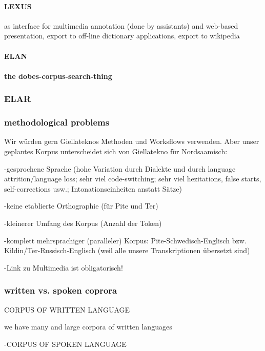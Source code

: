 \documentclass[a4paper,12pt]{article}
\begin{document}
\paragraph{LEXUS} as interface for multimedia annotation (done by assistants) and web-based presentation, export to off-line dictionary applications, export to wikipedia

\paragraph{ELAN}

\paragraph{the dobes-corpus-search-thing}

\subsubsection{ELAR}

\subsubsection{methodological problems}

Wir würden gern Giellateknos Methoden und Worksflows verwenden. Aber unser geplantes Korpus unterscheidet sich von Giellatekno für Nordsaamisch:

-gesprochene Sprache (hohe Variation durch Dialekte und durch language attrition/language loss; sehr viel code-switching; sehr viel hezitations, false starts, self-corrections usw.; Intonationseinheiten anstatt Sätze)

-keine etablierte Orthographie (für Pite und Ter)

-kleinerer Umfang des Korpus (Anzahl der Token)

-komplett mehrsprachiger (paralleler) Korpus: Pite-Schwedisch-Englisch bzw. Kildin/Ter-Russisch-Englisch (weil alle unsere Transkriptionen übersetzt sind)

-Link zu Multimedia ist obligatorisch!


\subsubsection{written vs. spoken coprora} 
CORPUS OF WRITTEN LANGUAGE

we have many and large corpora of written languages

-CORPUS OF SPOKEN LANGUAGE
\end{document}
